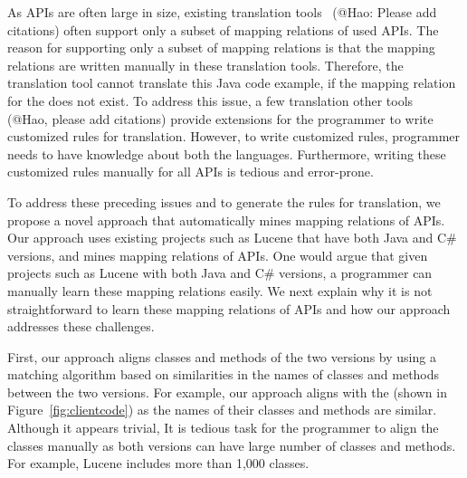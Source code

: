 As APIs are often large in size, existing translation tools~\cite{}
(@Hao: Please add citations) often support only a subset of
mapping relations of used APIs. The reason for supporting only
a subset of mapping relations is that the mapping relations are written
manually in these translation tools. Therefore, the translation
tool cannot translate this Java code example, if the mapping relation
for the  does not exist. To address this issue,
a few translation other tools~\cite{} (@Hao, please add citations)
provide extensions for the programmer to write customized rules for translation.
However, to write customized rules, programmer needs to have
knowledge about both the languages. Furthermore, writing these
customized rules manually for all APIs is tedious and error-prone.

To address these preceding issues and to generate the rules for translation,
we propose a novel approach that automatically mines mapping
relations of APIs. Our approach uses existing projects such as
Lucene that have both Java and C\# versions, and mines
mapping relations of APIs. One would argue that given projects
such as Lucene with both Java and C\# versions, a programmer
can manually learn these mapping relations easily.
We next explain why it is not straightforward to learn these mapping relations of APIs
and how our approach addresses these challenges.

First, our approach aligns classes and methods of the two versions by using
a matching algorithm based on similarities in the names of classes
and methods between the two versions. For example, our approach aligns
 with the 
(shown in Figure~\ref{fig:clientcode}) as the names of their classes and methods are similar.
Although it appears trivial, It is tedious task for the programmer to align
the classes manually as both versions can have large number of classes and methods.
For example, Lucene includes more than 1,000 classes.


